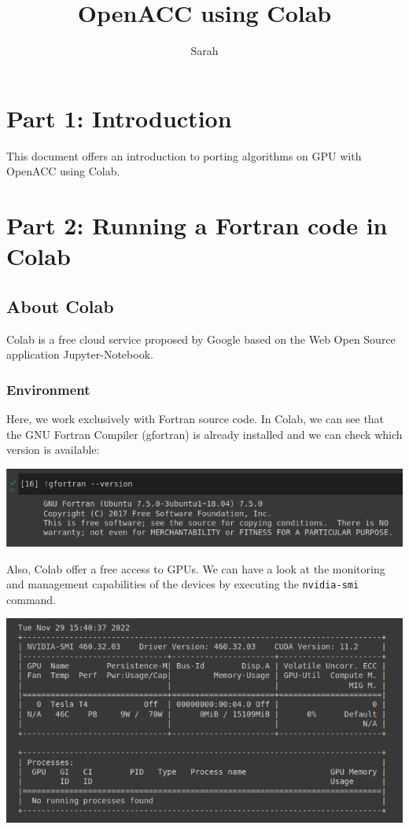 \documentclass[10pt,a4paper]{article}
\author{Sarah}
\title{OpenACC using Colab}
\newcommand{\code}[1]{\colorbox{light-gray}{\texttt{#1}}}
\begin{document}
\maketitle{}
\newpage

\section{Part 1: Introduction}
This document offers an introduction to porting algorithms on GPU with OpenACC using Colab.\\

\section{Part 2: Running a Fortran code in Colab}
\subsection{About Colab}
Colab is a free cloud service proposed by Google based on the Web Open Source application Jupyter-Notebook.\\
\subsubsection{Environment}
Here, we work exclusively with Fortran source code. In Colab, we can see that the GNU Fortran Compiler (gfortran) is already installed and we can check which version is available:
\begin{center}
\includegraphics[scale=0.5]{fortran_compiler.png}
\end{center}
\vspace{0.2cm}
Also, Colab offer a free access to GPUs. We can have a look at the monitoring and management capabilities of the devices by executing the \code{nvidia-smi} command.
\begin{center}
\includegraphics[scale=0.5]{nvidiasmi.png}
\end{center}
\end{document}
